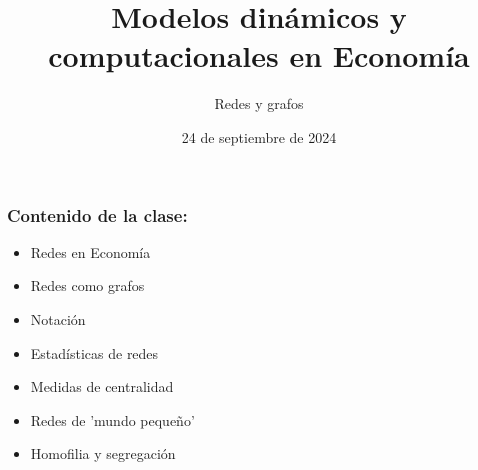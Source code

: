 \documentclass[11pt]{beamer}
\begin{document}
	\title{Modelos dinámicos y computacionales en Economía}
	\subtitle{Redes y grafos}
	\date{24 de septiembre de 2024}

	\frame[plain]{
	\begin{figure}
	\centering
	\label{fig:netlogo-title-wide-60}
\end{figure}	
		\vspace{-1cm}
\maketitle
}

\begin{frame}
\frametitle{Contenido de la clase:}
\begin{itemize}
\item Redes en Economía
\item Redes como grafos
\item Notación
\item Estadísticas de redes
\item Medidas de centralidad
\item Redes de 'mundo pequeño'
\item Homofilia y segregación
\end{itemize}
\end{frame}
\end{document}
